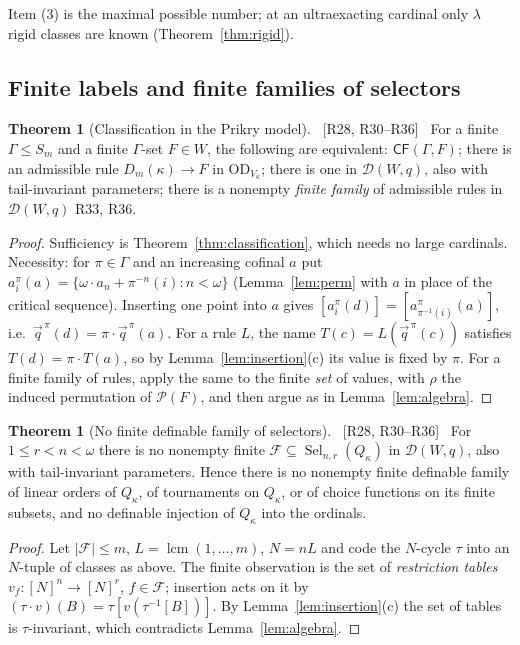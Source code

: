 \documentclass[11pt,letterpaper]{article}
\theoremstyle{definition}
\newtheorem{theorem}[definition]{Theorem}
\numberwithin{equation}{section}
\newcommand{\OD}{\mathrm{OD}}
\newcommand{\Pow}{\mathcal P}
\newcommand{\Sel}{\operatorname{Sel}}
\newcommand{\CF}{\mathsf{CF}}
\newcommand{\src}[1]{\unskip\ {\normalfont\small\sffamily\color{Olive}[#1]}\ }
\newcommand{\R}[1]{\textsf{R#1}}
\begin{document}
Item (3) is the maximal possible number; at an ultraexacting cardinal only $\lambda$ rigid classes are known (Theorem~\ref{thm:rigid}).

\subsection{Finite labels and finite families of selectors}

\begin{theorem}[Classification in the Prikry model]\label{thm:prikryclass}\src{R28, R30--R36}
For a finite $\Gamma\le S_m$ and a finite $\Gamma$-set $F\in W$, the following are equivalent: $\CF(\Gamma,F)$; there is an admissible rule $D_m(\kappa)\to F$ in $\OD_{V_\kappa}$; there is one in $\mathcal D(W,q)$, also with tail-invariant parameters; there is a nonempty \emph{finite family} of admissible rules in $\mathcal D(W,q)$ \R{33}, \R{36}.
\end{theorem}

\begin{proof}
Sufficiency is Theorem~\ref{thm:classification}, which needs no large cardinals. Necessity: for $\pi\in\Gamma$ and an increasing cofinal $a$ put $a^\pi_i(a)=\{\omega\cdot a_n+\pi^{-n}(i):n<\omega\}$ (Lemma~\ref{lem:perm} with $a$ in place of the critical sequence). Inserting one point into $a$ gives $[a^\pi_i(d)]=[a^\pi_{\pi^{-1}(i)}(a)]$, i.e.\ $\vec q^{\,\pi}(d)=\pi\cdot\vec q^{\,\pi}(a)$. For a rule $L$, the name $T(c)=L(\vec q^{\,\pi}(c))$ satisfies $T(d)=\pi\cdot T(a)$, so by Lemma~\ref{lem:insertion}(c) its value is fixed by $\pi$. For a finite family of rules, apply the same to the finite \emph{set} of values, with $\rho$ the induced permutation of $\Pow(F)$, and then argue as in Lemma~\ref{lem:algebra}.
\end{proof}

\begin{theorem}[No finite definable family of selectors]\label{thm:prikrysel}\src{R28, R30--R36}
For $1\le r<n<\omega$ there is no nonempty finite $\mathcal F\subseteq\Sel_{n,r}(Q_\kappa)$ in $\mathcal D(W,q)$, also with tail-invariant parameters. Hence there is no nonempty finite definable family of linear orders of $Q_\kappa$, of tournaments on $Q_\kappa$, or of choice functions on its finite subsets, and no definable injection of $Q_\kappa$ into the ordinals.
\end{theorem}

\begin{proof}
Let $|\mathcal F|\le m$, $L=\operatorname{lcm}(1,\dots,m)$, $N=nL$ and code the $N$-cycle $\tau$ into an $N$-tuple of classes as above. The finite observation is the set of \emph{restriction tables} $v_f:[N]^n\to[N]^r$, $f\in\mathcal F$; insertion acts on it by $(\tau\cdot v)(B)=\tau[v(\tau^{-1}[B])]$. By Lemma~\ref{lem:insertion}(c) the set of tables is $\tau$-invariant, which contradicts Lemma~\ref{lem:algebra}.
\end{proof}
\end{document}
